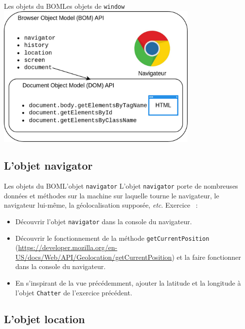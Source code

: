 \documentclass{beamer}
\begin{document}
    \begin{frame}{Les objets du BOM}{Les objets de \lstinline{window}}
        \centering
        \includegraphics[width=10cm]{image/bom-n-dom}
    \end{frame}

    \subsection{L'objet navigator}\label{subsec:navigator}

    \begin{frame}{Les objets du BOM}{L'objet \lstinline{navigator}}
        L'objet \lstinline{navigator} porte de nombreuses données et méthodes sur la machine sur laquelle tourne le navigateur, le navigateur lui-même, la géolocalisation supposée, \textit{etc}.
        \bigbreak
        Exercice \execcounterdispinc{}~:
        \begin{itemize}
            \item Découvrir l'objet \lstinline{navigator} dans la console du navigateur.
            \item Découvrir le fonctionnement de la méthode \lstinline{getCurrentPosition} (\url{https://developer.mozilla.org/en-US/docs/Web/API/Geolocation/getCurrentPosition}) et la faire fonctionner dans la console du navigateur.
            \item En s'inspirant de la vue précédemment, ajouter la latitude et la longitude à l'objet \lstinline{Chatter} de l'exercice précédent.
        \end{itemize}
    \end{frame}

    \subsection{L'objet location}\label{subsec:location}
\end{document}
